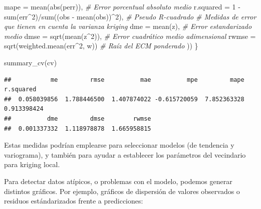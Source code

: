 \documentclass[
  spanish,
]{book}
\newenvironment{Shaded}{\begin{snugshade}}{\end{snugshade}}
\newcommand{\AttributeTok}[1]{\textcolor[rgb]{0.77,0.63,0.00}{#1}}
\newcommand{\CommentTok}[1]{\textcolor[rgb]{0.56,0.35,0.01}{\textit{#1}}}
\newcommand{\DecValTok}[1]{\textcolor[rgb]{0.00,0.00,0.81}{#1}}
\newcommand{\FunctionTok}[1]{\textcolor[rgb]{0.00,0.00,0.00}{#1}}
\newcommand{\NormalTok}[1]{#1}
\newcommand{\SpecialCharTok}[1]{\textcolor[rgb]{0.00,0.00,0.00}{#1}}
\theoremstyle{break}
\theoremstyle{definition}
\theoremstyle{definition}
\theoremstyle{definition}
\theoremstyle{definition}
\theoremstyle{remark}
\begin{document}
\begin{Shaded}
\begin{Highlighting}[]
    \AttributeTok{mape =} \FunctionTok{mean}\NormalTok{(}\FunctionTok{abs}\NormalTok{(perr)),   }\CommentTok{\# Error porcentual absoluto medio}
    \AttributeTok{r.squared =} \DecValTok{1} \SpecialCharTok{{-}} \FunctionTok{sum}\NormalTok{(err}\SpecialCharTok{\^{}}\DecValTok{2}\NormalTok{)}\SpecialCharTok{/}\FunctionTok{sum}\NormalTok{((obs }\SpecialCharTok{{-}} \FunctionTok{mean}\NormalTok{(obs))}\SpecialCharTok{\^{}}\DecValTok{2}\NormalTok{), }\CommentTok{\# Pseudo R{-}cuadrado}
    \CommentTok{\# Medidas de error que tienen en cuenta la varianza kriging}
    \AttributeTok{dme =} \FunctionTok{mean}\NormalTok{(z),            }\CommentTok{\# Error estandarizado medio}
    \AttributeTok{dmse =} \FunctionTok{sqrt}\NormalTok{(}\FunctionTok{mean}\NormalTok{(z}\SpecialCharTok{\^{}}\DecValTok{2}\NormalTok{)),    }\CommentTok{\# Error cuadrático medio adimensional}
    \AttributeTok{rwmse =} \FunctionTok{sqrt}\NormalTok{(}\FunctionTok{weighted.mean}\NormalTok{(err}\SpecialCharTok{\^{}}\DecValTok{2}\NormalTok{, w)) }\CommentTok{\# Raíz del ECM ponderado}
\NormalTok{  ))}
\NormalTok{\}}

\FunctionTok{summary\_cv}\NormalTok{(cv)}
\end{Highlighting}
\end{Shaded}

\begin{verbatim}
##           me         rmse          mae          mpe         mape    r.squared 
##  0.058039856  1.788446500  1.407874022 -0.615720059  7.852363328  0.913398424 
##          dme         dmse        rwmse 
##  0.001337332  1.118978878  1.665958815
\end{verbatim}

Estas medidas podrían emplearse para seleccionar modelos (de tendencia y variograma), y también para ayudar a establecer los parámetros del vecindario para kriging local.

Para detectar datos atípicos, o problemas con el modelo, podemos generar distintos gráficos.
Por ejemplo, gráficos de dispersión de valores observados o residuos estándarizados frente a predicciones:
\end{document}
